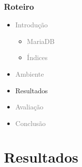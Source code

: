 \documentclass[10pt]{beamer}
\begin{document}
\begin{frame}
  \frametitle{Roteiro}

  \begin{itemize}

    \item[\color{gray}{$\bullet$}] \textcolor{gray}{Introdução}
    
    \begin{itemize}
      \item[\ ] \textcolor{gray}{MariaDB}
      \item[\ ] \textcolor{gray}{Índices}
    \end{itemize}


    \item[\color{gray}{$\bullet$}] \textcolor{gray}{Ambiente}

    \item Resultados

    \item[\color{gray}{$\bullet$}] \textcolor{gray}{Avaliação}

    \item[\color{gray}{$\bullet$}] \textcolor{gray}{Conclusão}

  \end{itemize}

\end{frame}



\section{Resultados}
\end{document}
